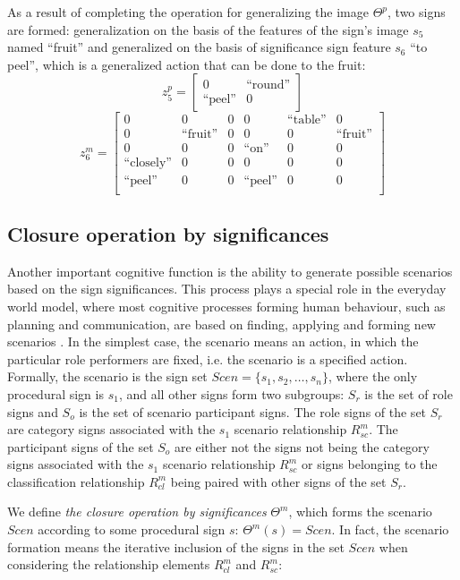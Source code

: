 \documentclass[12pt]{scrartcl}
\begin{document}
	As a result of completing the  operation for generalizing the image $\Theta^p$, two signs are formed: generalization on the basis of the features of the sign's image $s_5$ named ``fruit'' and generalized on the basis of significance sign feature $s_6$ ``to peel'', which is a generalized action that can be done to the fruit:
	\[
	z_5^p = \begin{bmatrix}
	0& \text{``round''} \\
	\text{``peel''} &0
	\end{bmatrix}
	\]
	\[
	z_6^m= \left[\begin{array}{ccc|cccc}
	0&0&0&0&\text{``table''}&0\\
	0&\text{``fruit''}&0& 0&0&\text{``fruit''}\\
	0& 0& 0 &\text{``on''} &0&0\\
	\text{``closely''}& 0& 0 &0 &0&0\\
	\text{``peel''} &0 &0 &\text{``peel''}  &0&0\\
	\end{array}
	\right]
	\] 
	
	\subsection{Closure operation by significances}
	Another important cognitive function is the ability to generate possible scenarios based on the sign significances. This process plays a special role in the everyday world model, where most cognitive processes forming human behaviour, such as planning and communication, are based on finding, applying and forming new scenarios \cite{Osipov2015d}. In the simplest case, the scenario means an action, in which the particular role performers are fixed, i.e. the scenario is a specified action. Formally, the scenario is the sign set $Scen=\{s_1,s_2,\dots, s_n\}$, where the only procedural sign is $s_1$, and all other signs form two subgroups: $S_r$ is the set of role signs and $S_o$ is the set of scenario participant signs. The role signs of the set $S_r$ are category signs associated with the $s_1$ scenario relationship $R_{sc}^m$. The participant signs of the set $S_o$ are either not the signs not being the category signs associated with the $s_1$ scenario relationship $R_{sc}^m$ or signs belonging to the classification relationship $R_{cl}^m$ being paired with other signs of the set $S_r$.
	
	We define \textit{the closure operation by significances} $\Theta^m$, which forms the scenario $Scen$ according to some procedural sign $s$: $\Theta^m(s)=Scen$. In fact, the scenario formation means the iterative inclusion of the signs in the set $Scen$ when considering the relationship elements $R_{cl}^m$ and $R_{sc}^m$:
	
\end{document}
